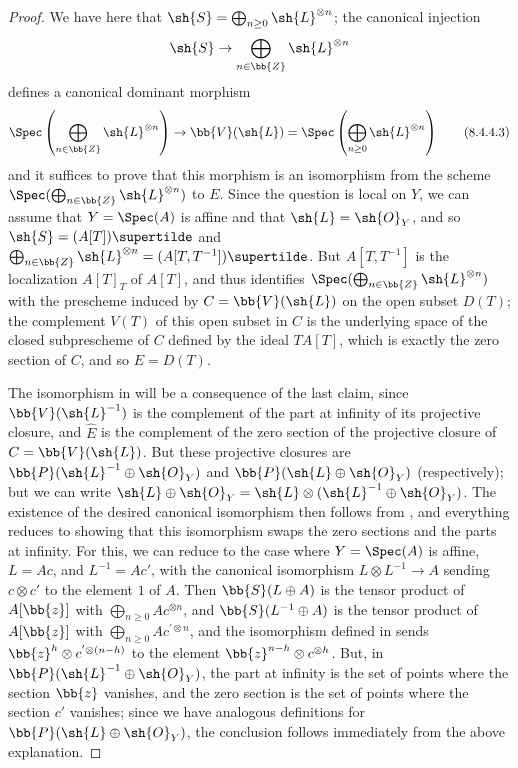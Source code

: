 \begin{proof}
We have here that $\sh{S}=\bigoplus_{n\geq0}\sh{L}^{\otimes n}$;
the canonical injection
\[
  \sh{S} \to \bigoplus_{n\in\bb{Z}} \sh{L}^{\otimes n}
\]
defines a canonical dominant morphism
\[
\label{eq:2.8.4.4.3}
  \Spec\left(
    \bigoplus_{n\in\bb{Z}} \sh{L}^{\otimes n}
  \right)
  \to
  \bb{V}(\sh{L})
  =
  \Spec\left(
    \bigoplus_{n\geq0} \sh{L}^{\otimes n}
  \right)
\tag{8.4.4.3}
\]
and it suffices to prove that this morphism is an isomorphism from the scheme $\Spec(\bigoplus_{n\in\bb{Z}} \sh{L}^{\otimes n})$ to $E$.
Since the question is local on $Y$, we can assume that $Y=\Spec(A)$ is affine
and that $\sh{L}=\sh{O}_Y$, and so $\sh{S}=(A[T])\supertilde$ and $\bigoplus_{n\in\bb{Z}}\sh{L}^{\otimes n} = (A[T,T^{-1}])\supertilde$.
But $A[T,T^{-1}]$ is the localization $A[T]_T$ of $A[T]$, and thus  identifies $\Spec(\bigoplus_{n\in\bb{Z}}\sh{L}^{\otimes n})$ with the prescheme induced by $C=\bb{V}(\sh{L})$ on the open subset $D(T)$;
the complement $V(T)$ of this open subset in $C$ is the underlying space of the closed subprescheme of $C$ defined by the ideal $TA[T]$, which is exactly the zero section of $C$, and so $E=D(T)$.

The isomorphism in  will be a consequence of the last claim, since $\bb{V}(\sh{L}^{-1})$ is the complement of the part at infinity of its projective closure, and $\widehat{E}$ is the complement of the zero section of the projective closure of $C=\bb{V}(\sh{L})$.
But these projective closures are $\bb{P}(\sh{L}^{-1}\oplus\sh{O}_Y)$ and $\bb{P}(\sh{L}\oplus\sh{O}_Y)$ (respectively);
but we can write $\sh{L}\oplus\sh{O}_Y = \sh{L}\otimes(\sh{L}^{-1}\oplus\sh{O}_Y)$.
The existence of the desired canonical isomorphism then follows from , and everything reduces to showing that this isomorphism swaps the zero sections and the parts at infinity.
For this, we can reduce to the case where $Y=\Spec(A)$ is affine, $L=Ac$, and $L^{-1}=Ac'$, with the canonical isomorphism $L\otimes L^{-1}\to A$ sending $c\otimes c'$ to the element $1$ of $A$.
Then $\bb{S}(L\oplus A)$ is the tensor product of $A[\bb{z}]$ with $\bigoplus_{n\geq0}Ac^{\otimes n}$, and $\bb{S}(L^{-1}\oplus A)$ is the tensor product of $A[\bb{z}]$ with $\bigoplus_{n\geq0}Ac^{'\otimes n}$, and the isomorphism defined in  sends $\bb{z}^h\otimes c^{'\otimes(n-h)}$ to the element $\bb{z}^{n-h}\otimes c^{\otimes h}$.
But, in $\bb{P}(\sh{L}^{-1}\oplus\sh{O}_Y)$, the part at infinity is the set of points where the section $\bb{z}$ vanishes, and the zero section is the set of points where the section $c'$ vanishes;
since we have analogous definitions for $\bb{P}(\sh{L}\oplus\sh{O}_Y)$, the conclusion follows immediately from the above explanation.
\end{proof}


